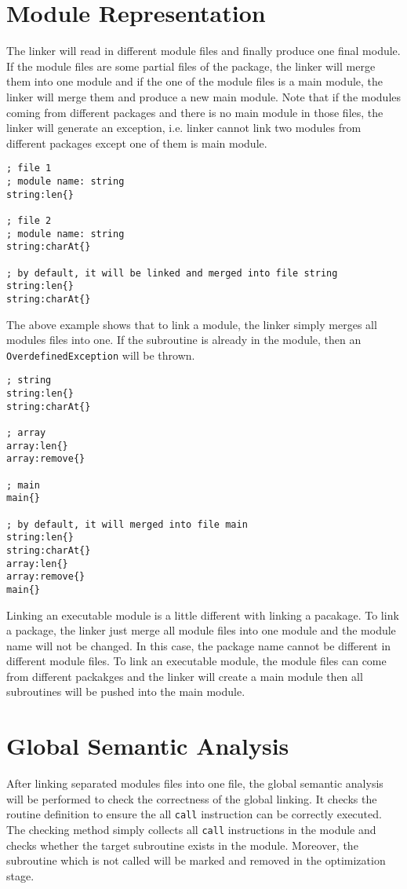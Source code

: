 \section{Module Representation}
The linker will read in different module files and finally produce one final module. If the module files are some partial files of the package, the linker will merge them into one module and if the one of the module files is a main module, the linker will merge them and produce a new main module. Note that if the modules coming from different packages and there is no main module in those files, the linker will generate an exception, i.e. linker cannot link two modules from different packages except one of them is main module.
\begin{lstlisting}[language=LucyX]
; file 1
; module name: string
string:len{}

; file 2
; module name: string
string:charAt{}

; by default, it will be linked and merged into file string
string:len{}
string:charAt{}
\end{lstlisting}
The above example shows that to link a module, the linker simply merges all modules files into one. If the subroutine is already in the module, then an \texttt{OverdefinedException} will be thrown.
\begin{lstlisting}[language=LucyX]
; string
string:len{}
string:charAt{}

; array
array:len{}
array:remove{}

; main
main{}

; by default, it will merged into file main
string:len{}
string:charAt{}
array:len{}
array:remove{}
main{}
\end{lstlisting}
Linking an executable module is a little different with linking a pacakage. To link a package, the linker just merge all module files into one module and the module name will not be changed. In this case, the package name cannot be different in different module files. To link an executable module, the module files can come from different packakges and the linker will create a main module then all subroutines will be pushed into the main module.

\section{Global Semantic Analysis}
After linking separated modules files into one file, the global semantic analysis will be performed to check the correctness of the global linking. It checks the routine definition to ensure the all \texttt{call} instruction can be correctly executed. \\
The checking method simply collects all \texttt{call} instructions in the module and checks whether the target subroutine exists in the module. Moreover, the subroutine which is not called will be marked and removed in the optimization stage.
